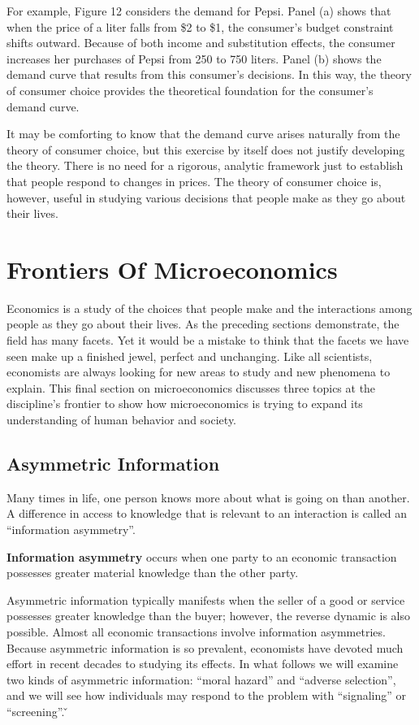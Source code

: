 For example, Figure 12 considers the demand for Pepsi. Panel (a) shows that when the price of a liter falls from \$2
to \$1, the consumer's budget constraint shifts outward. Because of both income and substitution effects, the
consumer increases her purchases of Pepsi from 250 to 750 liters. Panel (b) shows the demand curve that results from
this consumer's decisions. In this way, the theory of consumer choice provides the theoretical foundation for the
consumer's demand curve.


It may be comforting to know that the demand curve arises naturally from the theory of consumer choice, but this
exercise by itself does not justify developing the theory. There is no need for a rigorous, analytic framework just
to establish that people respond to changes in prices. The theory of consumer choice is, however, useful in studying
various decisions that people make as they go about their lives.

\section{Frontiers Of Microeconomics}

Economics is a study of the choices that people make and the interactions among people as they go about their lives.
As the preceding sections demonstrate, the field has many facets. Yet it would be a mistake to think that the facets
we have seen make up a finished jewel, perfect and unchanging. Like all scientists, economists are always looking for
new areas to study and new phenomena to explain. This final section on microeconomics discusses three topics at the
discipline's frontier to show how microeconomics is trying to expand its understanding of human behavior and society.

\subsection{Asymmetric Information}

Many times in life, one person knows more about what is going on than another. A difference in access to knowledge
that is relevant to an interaction is called an ``information asymmetry''.

\textbf{Information asymmetry} occurs when one party to an economic transaction possesses greater material knowledge
than the other party.
\ed

Asymmetric information typically manifests when the seller of a good or service possesses greater knowledge than the
buyer; however, the reverse dynamic is also possible. Almost all economic transactions involve information
asymmetries. Because asymmetric information is so prevalent, economists have devoted much effort in recent decades to
studying its effects. In what follows we will examine two kinds of asymmetric information: ``moral hazard'' and
``adverse selection'', and we will see how individuals may respond to the problem with ``signaling'' or ``screening''. \v

